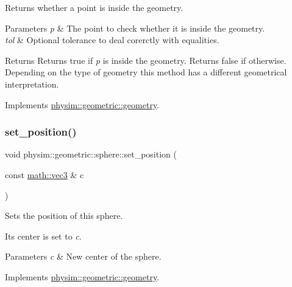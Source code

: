 Returns whether a point is inside the geometry. 


\begin{DoxyParams}{Parameters}
{\em p} & The point to check whether it is inside the geometry. \\
\hline
{\em tol} & Optional tolerance to deal corerctly with equalities. \\
\hline
\end{DoxyParams}
\begin{DoxyReturn}{Returns}
Returns true if {\itshape p} is inside the geometry. Returns false if otherwise. Depending on the type of geometry this method has a different geometrical interpretation. 
\end{DoxyReturn}


Implements \hyperlink{classphysim_1_1geometric_1_1geometry_a325d4049d4e14584b389a2f1202bdc08}{physim\+::geometric\+::geometry}.

\mbox{\label{classphysim_1_1geometric_1_1sphere_ad31c556961c46dbbdf3ade9bd7035d58}} 
\subsubsection{\texorpdfstring{set\+\_\+position()}{set\_position()}}
{\footnotesize\ttfamily void physim\+::geometric\+::sphere\+::set\+\_\+position (\begin{DoxyParamCaption}\item[{const \hyperlink{structphysim_1_1math_1_1vec3}{math\+::vec3} \&}]{c }\end{DoxyParamCaption})\hspace{0.3cm}{\ttfamily [virtual]}}



Sets the position of this sphere. 

Its center is set to {\itshape c}. 
\begin{DoxyParams}{Parameters}
{\em c} & New center of the sphere. \\
\hline
\end{DoxyParams}


Implements \hyperlink{classphysim_1_1geometric_1_1geometry_a5b029b5fa8e55847d5aa06b1d341c88c}{physim\+::geometric\+::geometry}.

\mbox{\label{classphysim_1_1geometric_1_1sphere_a86fbbf341725677864abc6c692096a26}} 
